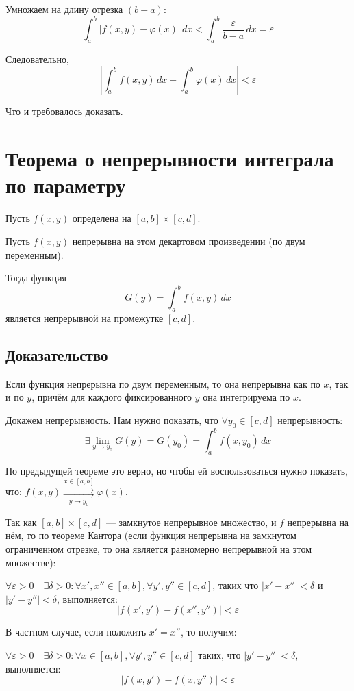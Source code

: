 \documentclass{article}
\begin{document}
Умножаем на длину отрезка $(b-a)$:
\[
\int_a^b |f(x,y) - \varphi(x)| \, dx < \int_a^b \frac{\varepsilon}{b-a} \, dx = \varepsilon
\]

Следовательно,
\[
\left| \int_a^b f(x,y) \, dx - \int_a^b \varphi(x) \, dx \right| < \varepsilon
\]

Что и требовалось доказать.

\section*{Теорема о непрерывности интеграла по параметру}

Пусть $f(x,y)$ определена на $[a,b] \times [c,d]$.

Пусть $f(x,y)$ непрерывна на этом декартовом произведении (по двум переменным).

Тогда функция
\[
G(y) = \int_a^b f(x,y) \, dx
\]
является непрерывной на промежутке $[c,d]$.

\subsection*{Доказательство}

Если функция непрерывна по двум переменным, то она непрерывна как по $x$, так и по $y$, причём для каждого фиксированного $y$ она интегрируема по $x$.

Докажем непрерывность. Нам нужно показать, что $\forall y_0 \in [c,d]$ непрерывность:
\[
\exists \lim_{y \to y_0} G(y) = G(y_0) = \int_a^b f(x,y_0) \, dx
\]

По предыдущей теореме это верно, но чтобы ей воспользоваться нужно показать, что:
\quad $f(x, y) \mathop{\rightrightarrows}\limits^{ x \in [a, b]}_{\,y \to y_0\,} \varphi(x)$.


Так как $[a,b] \times [c,d]$ — замкнутое непрерывное множество, и $f$ непрерывна на нём, то по теореме Кантора (если функция непрерывна на замкнутом ограниченном отрезке, то она является равномерно непрерывной на этом множестве):

$\forall \varepsilon > 0 \quad \exists \delta > 0 : \forall x', x'' \in [a,b], \forall y', y'' \in [c,d]$, таких что $|x' - x''| < \delta$ и $|y' - y''| < \delta$, выполняется:
\[
|f(x',y') - f(x'',y'')| < \varepsilon
\]

В частном случае, если положить $x' = x''$, то получим:

$\forall \varepsilon > 0 \quad \exists \delta > 0 : \forall x \in [a,b], \forall y', y'' \in [c,d]$ таких, что $|y' - y''| < \delta$, выполняется:
\[
|f(x,y') - f(x,y'')| < \varepsilon
\]
\end{document}
